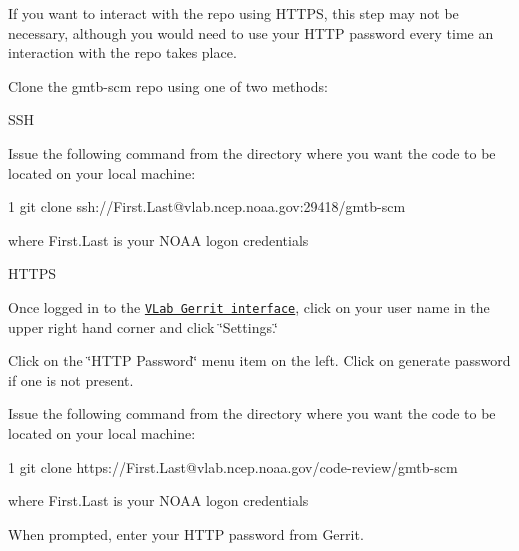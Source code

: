 \begin{DoxyItemize}
\begin{DoxyItemize}
\begin{DoxyItemize}
\end{DoxyItemize}
\item If you want to interact with the repo using H\+T\+T\+PS, this step may not be necessary, although you would need to use your H\+T\+TP password every time an interaction with the repo takes place.
\end{DoxyItemize}
\item Clone the gmtb-\/scm repo using one of two methods\+:
\begin{DoxyEnumerate}
\item S\+SH
\begin{DoxyItemize}
\item Issue the following command from the directory where you want the code to be located on your local machine\+:
\item 
\begin{DoxyCode}
1 git clone ssh://First.Last@vlab.ncep.noaa.gov:29418/gmtb-scm 
\end{DoxyCode}
 where First.\+Last is your N\+O\+AA logon credentials
\end{DoxyItemize}
\item H\+T\+T\+PS
\begin{DoxyItemize}
\item Once logged in to the \href{https://vlab.ncep.noaa.gov/code-review/}{\tt V\+Lab Gerrit interface}, click on your user name in the upper right hand corner and click \char`\"{}\+Settings.\char`\"{}
\item Click on the \char`\"{}\+H\+T\+T\+P Password\char`\"{} menu item on the left. Click on generate password if one is not present.
\item Issue the following command from the directory where you want the code to be located on your local machine\+:
\item 
\begin{DoxyCode}
1 git clone https://First.Last@vlab.ncep.noaa.gov/code-review/gmtb-scm 
\end{DoxyCode}
 where First.\+Last is your N\+O\+AA logon credentials
\item When prompted, enter your H\+T\+TP password from Gerrit.
\end{DoxyItemize}
\end{DoxyEnumerate}
\end{DoxyItemize}

